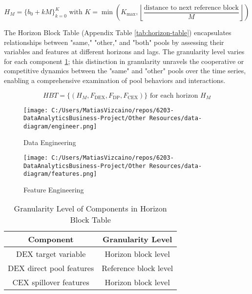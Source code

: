 \documentclass{article}
\begin{document}
\begin{equation}
H_{M} = \{b_{0}+kM\}_{k=0}^{K} \text{ with } K = \min \left( K_{\text{max}}, \left\lfloor \frac{\text{distance to next reference block}}{M} \right\rfloor \right)
\end{equation}

The Horizon Block Table (Appendix Table \ref{tab:horizon-table}) encapsulates relationships between "same," "other," and "both" pools by assessing their variables and features at different horizons and lags. The granularity level varies for each component  \ref{tab:granularity}; this distinction in granularity unravels the cooperative or competitive dynamics between the "same" and "other" pools over the time series, enabling a comprehensive examination of pool behaviors and interactions.

\begin{equation}
  HBT = \{ (H_{M}, F_{\text{DEX}}, F_{\text{DP}}, F_{\text{CEX}}) \} \text{ for each horizon } H_{M} 
  \end{equation}

\begin{figure}[htbp]
  \begin{minipage}{0.5\textwidth}
  \centering
  \texttt{[image: C:/Users/MatiasVizcaino/repos/6203-DataAnalyticsBusiness-Project/Other Resources/data-diagram/engineer.png]}
  \caption{Data Engineering}
  \label{fig:data-diagram-engineer}
  \end{minipage}
  \begin{minipage}{0.45\textwidth}
  \centering
  \texttt{[image: C:/Users/MatiasVizcaino/repos/6203-DataAnalyticsBusiness-Project/Other Resources/data-diagram/features.png]}
  \caption{Feature Engineering}
  \label{fig:data-diagram-features}
  \end{minipage}
\end{figure}

\begin{table}[htbp]
\centering
\small
\begin{tabular}{|c|c|}
\hline
\textbf{Component} & \textbf{Granularity Level} \\
\hline
DEX target variable & Horizon block level \\
\hline
DEX direct pool features & Reference block level \\
\hline
CEX spillover features & Horizon block level \\
\hline
\end{tabular}
\caption{Granularity Level of Components in Horizon Block Table}
\label{tab:granularity}
\end{table}
\end{document}
